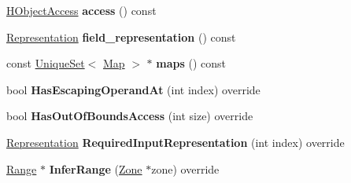 \begin{DoxyCompactItemize}
\item 
\hyperlink{classv8_1_1internal_1_1_h_object_access}{H\+Object\+Access} {\bfseries access} () const \hypertarget{classv8_1_1internal_1_1_h_load_named_field_acf4ef65e50395c31f3e804ffb8d42666}{}\label{classv8_1_1internal_1_1_h_load_named_field_acf4ef65e50395c31f3e804ffb8d42666}

\item 
\hyperlink{classv8_1_1internal_1_1_representation}{Representation} {\bfseries field\+\_\+representation} () const \hypertarget{classv8_1_1internal_1_1_h_load_named_field_a4021ab1ee08597b0ebf7aa1927fed7f6}{}\label{classv8_1_1internal_1_1_h_load_named_field_a4021ab1ee08597b0ebf7aa1927fed7f6}

\item 
const \hyperlink{classv8_1_1internal_1_1_unique_set}{Unique\+Set}$<$ \hyperlink{classv8_1_1internal_1_1_map}{Map} $>$ $\ast$ {\bfseries maps} () const \hypertarget{classv8_1_1internal_1_1_h_load_named_field_a42b5f5cc4310ebb4a09a062e75b91068}{}\label{classv8_1_1internal_1_1_h_load_named_field_a42b5f5cc4310ebb4a09a062e75b91068}

\item 
bool {\bfseries Has\+Escaping\+Operand\+At} (int index) override\hypertarget{classv8_1_1internal_1_1_h_load_named_field_a516aa8cfa2ccc7924c97d9e15e8d105d}{}\label{classv8_1_1internal_1_1_h_load_named_field_a516aa8cfa2ccc7924c97d9e15e8d105d}

\item 
bool {\bfseries Has\+Out\+Of\+Bounds\+Access} (int size) override\hypertarget{classv8_1_1internal_1_1_h_load_named_field_a1eb79d0fcaeb47af2c2c471f240a188c}{}\label{classv8_1_1internal_1_1_h_load_named_field_a1eb79d0fcaeb47af2c2c471f240a188c}

\item 
\hyperlink{classv8_1_1internal_1_1_representation}{Representation} {\bfseries Required\+Input\+Representation} (int index) override\hypertarget{classv8_1_1internal_1_1_h_load_named_field_a497e1e157ffee70715ac01443aaa14d4}{}\label{classv8_1_1internal_1_1_h_load_named_field_a497e1e157ffee70715ac01443aaa14d4}

\item 
\hyperlink{classv8_1_1internal_1_1_range}{Range} $\ast$ {\bfseries Infer\+Range} (\hyperlink{classv8_1_1internal_1_1_zone}{Zone} $\ast$zone) override\hypertarget{classv8_1_1internal_1_1_h_load_named_field_a7ef1e978c4b80d534cc6cb76c8ef5bea}{}\label{classv8_1_1internal_1_1_h_load_named_field_a7ef1e978c4b80d534cc6cb76c8ef5bea}


\end{DoxyCompactItemize}
